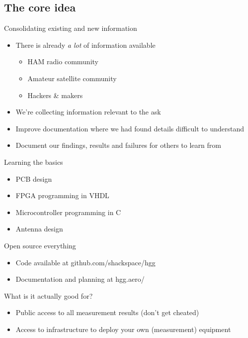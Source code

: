 \subsection{The core idea}
	\begin{frame}{Consolidating existing and new information}
		\begin{itemize}
			\item There is already \emph{a lot} of information available
			\begin{itemize}
				\item HAM radio community
				\item Amateur satellite community
				\item Hackers \& makers
			\end{itemize}
			\item We're collecting information relevant to the ask
			\item Improve documentation where we had found details difficult to understand
			\item Document our findings, results and failures for others to learn from
		\end{itemize}
	\end{frame}

	\begin{frame}{Learning the basics}
		\begin{itemize}
			\item PCB design
			\item FPGA programming in VHDL
			\item Microcontroller programming in C
			\item Antenna design
		\end{itemize}
	\end{frame}

	\begin{frame}{Open source everything}
		\begin{itemize}
			\item Code available at github.com/shackspace/hgg
			\item Documentation and planning at hgg.aero/
		\end{itemize}
	\end{frame}

	\begin{frame}{What is it actually good for?}
		\begin{itemize}
			\item Public access to all measurement results (don't get cheated)
			\item Access to infrastructure to deploy your own (measurement) equipment
		\end{itemize}
	\end{frame}


